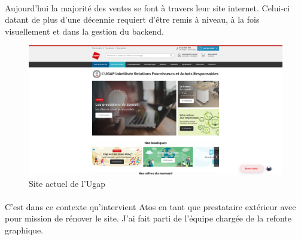 \documentclass[12pt]{article}
\begin{document}
\begin {sloppypar}
\paragraph{}
Aujourd'hui la majorité des ventes se font à travers leur site internet. Celui-ci datant de plus d'une décennie 
requiert d'être remis à niveau, à la fois visuellement et dans la gestion du backend. 
\newpage
\begin{figure}
  \includegraphics[width=\textwidth] {sc_ugap.png}
  \caption {Site actuel de l'Ugap}
\end{figure}
\paragraph{}
C'est dans ce contexte qu'intervient Atos en tant que prestataire extérieur avec pour mission de 
rénover le site. J'ai fait parti de l'équipe chargée de la refonte graphique. 

\end{sloppypar}
\end{document}
